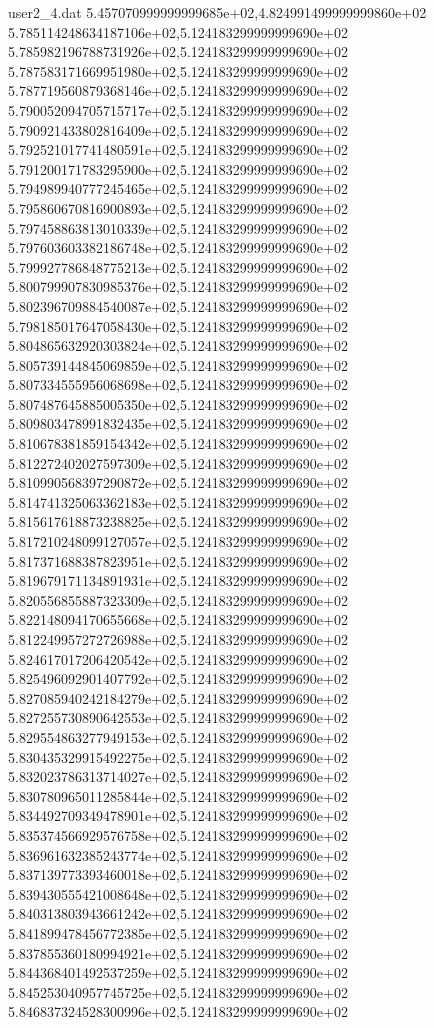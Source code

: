 \begin{filecontents}{user2_4.dat}
5.457070999999999685e+02,4.824991499999999860e+02
5.785114248634187106e+02,5.124183299999999690e+02
5.785982196788731926e+02,5.124183299999999690e+02
5.787583171669951980e+02,5.124183299999999690e+02
5.787719560879368146e+02,5.124183299999999690e+02
5.790052094705715717e+02,5.124183299999999690e+02
5.790921433802816409e+02,5.124183299999999690e+02
5.792521017741480591e+02,5.124183299999999690e+02
5.791200171783295900e+02,5.124183299999999690e+02
5.794989940777245465e+02,5.124183299999999690e+02
5.795860670816900893e+02,5.124183299999999690e+02
5.797458863813010339e+02,5.124183299999999690e+02
5.797603603382186748e+02,5.124183299999999690e+02
5.799927786848775213e+02,5.124183299999999690e+02
5.800799907830985376e+02,5.124183299999999690e+02
5.802396709884540087e+02,5.124183299999999690e+02
5.798185017647058430e+02,5.124183299999999690e+02
5.804865632920303824e+02,5.124183299999999690e+02
5.805739144845069859e+02,5.124183299999999690e+02
5.807334555956068698e+02,5.124183299999999690e+02
5.807487645885005350e+02,5.124183299999999690e+02
5.809803478991832435e+02,5.124183299999999690e+02
5.810678381859154342e+02,5.124183299999999690e+02
5.812272402027597309e+02,5.124183299999999690e+02
5.810990568397290872e+02,5.124183299999999690e+02
5.814741325063362183e+02,5.124183299999999690e+02
5.815617618873238825e+02,5.124183299999999690e+02
5.817210248099127057e+02,5.124183299999999690e+02
5.817371688387823951e+02,5.124183299999999690e+02
5.819679171134891931e+02,5.124183299999999690e+02
5.820556855887323309e+02,5.124183299999999690e+02
5.822148094170655668e+02,5.124183299999999690e+02
5.812249957272726988e+02,5.124183299999999690e+02
5.824617017206420542e+02,5.124183299999999690e+02
5.825496092901407792e+02,5.124183299999999690e+02
5.827085940242184279e+02,5.124183299999999690e+02
5.827255730890642553e+02,5.124183299999999690e+02
5.829554863277949153e+02,5.124183299999999690e+02
5.830435329915492275e+02,5.124183299999999690e+02
5.832023786313714027e+02,5.124183299999999690e+02
5.830780965011285844e+02,5.124183299999999690e+02
5.834492709349478901e+02,5.124183299999999690e+02
5.835374566929576758e+02,5.124183299999999690e+02
5.836961632385243774e+02,5.124183299999999690e+02
5.837139773393460018e+02,5.124183299999999690e+02
5.839430555421008648e+02,5.124183299999999690e+02
5.840313803943661242e+02,5.124183299999999690e+02
5.841899478456772385e+02,5.124183299999999690e+02
5.837855360180994921e+02,5.124183299999999690e+02
5.844368401492537259e+02,5.124183299999999690e+02
5.845253040957745725e+02,5.124183299999999690e+02
5.846837324528300996e+02,5.124183299999999690e+02

\end{filecontents}
